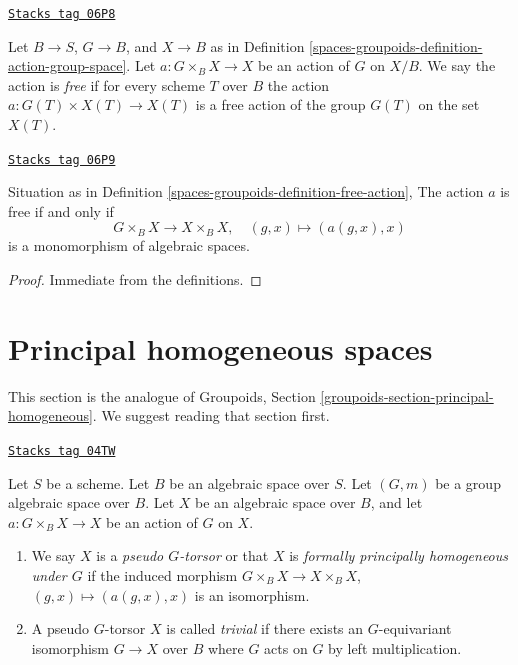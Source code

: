 \begin{definition}
\label{spaces-groupoids-definition-free-action}
\href{https://stacks.math.columbia.edu/tag/06P8}{\texttt{Stacks tag 06P8}}

Let $B \to S$, $G \to B$, and $X \to B$ as in
Definition \ref{spaces-groupoids-definition-action-group-space}.
Let $a : G \times_B X \to X$ be an action of $G$ on $X/B$.
We say the action is {\it free} if for every scheme $T$ over $B$
the action $a : G(T) \times X(T) \to X(T)$ is a free action of
the group $G(T)$ on the set $X(T)$.
\end{definition}

\begin{lemma}
\label{spaces-groupoids-lemma-free-action}
\href{https://stacks.math.columbia.edu/tag/06P9}{\texttt{Stacks tag 06P9}}

Situation as in
Definition \ref{spaces-groupoids-definition-free-action},
The action $a$ is free if and only if
$$
G \times_B X \to X \times_B X, \quad (g, x) \mapsto (a(g, x), x)
$$
is a monomorphism of algebraic spaces.
\end{lemma}

\begin{proof}
Immediate from the definitions.
\end{proof}

\section{Principal homogeneous spaces}
\label{spaces-groupoids-section-principal-homogeneous}
This section is the analogue of
Groupoids, Section \ref{groupoids-section-principal-homogeneous}.
We suggest reading that section first.

\begin{definition}
\label{spaces-groupoids-definition-pseudo-torsor}
\href{https://stacks.math.columbia.edu/tag/04TW}{\texttt{Stacks tag 04TW}}

Let $S$ be a scheme. Let $B$ be an algebraic space over $S$.
Let $(G, m)$ be a group algebraic space over $B$.
Let $X$ be an algebraic space over $B$, and let
$a : G \times_B X \to X$ be an action of $G$ on $X$.
\begin{enumerate}
\item We say $X$ is a {\it pseudo $G$-torsor} or that $X$ is
{\it formally principally homogeneous under $G$} if the induced
morphism $G \times_B X \to X \times_B X$,
$(g, x) \mapsto (a(g, x), x)$ is an isomorphism.
\item A pseudo $G$-torsor $X$ is called {\it trivial} if there exists
an $G$-equivariant isomorphism $G \to X$ over $B$ where $G$ acts on
$G$ by left multiplication.
\end{enumerate}
\end{definition}

